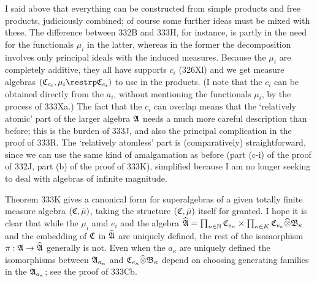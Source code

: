 {I said above that everything can be constructed from simple products and
free products, judiciously combined;  of course some further ideas must
be mixed with these.   The difference between 332B and 333H, for
instance, is partly in the need for the functionals $\mu_i$ in the
latter, whereas in the former the decomposition involves only principal
ideals with the induced measures.   Because the $\mu_i$ are
completely additive, they all have supports $c_i$ (326Xl) and we get
measure
algebras $(\frak C_{c_i},\mu_i\restrp\frak C_{c_i})$ to use in the
products.   (I note that the $c_i$ can be obtained directly from the
$a_i$, without mentioning the functionals $\mu_i$, by the process of
333Xa.)   The fact that the $c_i$ can overlap means that the `relatively
atomic' part of the larger algebra $\frak A$ needs a much more careful
description than before;  this is the burden of 333J, and also the
principal complication in the proof of 333R.   The `relatively atomless'
part is (comparatively) straightforward, since we can use the same kind
of amalgamation as before (part (c-i) of the proof of 332J, part (b)
of the proof of 333K), simplified because I am no longer seeking to deal
with algebras of infinite magnitude.

Theorem 333K gives a canonical form for superalgebras of a given totally
finite measure algebra $(\frak C,\bar\mu)$, taking the structure
$(\frak C,\bar\mu)$ itself for granted.   I hope it is clear that while
the $\mu_i$ amd $e_i$ and the algebra
$\widehat{\frak A}
=\prod_{n\in\Bbb N}\frak C_{e_n}
  \times\prod_{\kappa\in K}
  \frak C_{e_{\kappa}}\widehat{\otimes}\frak B_{\kappa}$ and the embedding of
$\frak C$ in $\widehat{\frak A}$ are uniquely defined, the rest of the
isomorphism $\pi:\frak A\to\widehat{\frak A}$ generally is not.   Even
when the $a_{\kappa}$ are uniquely defined the isomorphisms between
$\frak A_{a_{\kappa}}$ and
$\frak C_{e_{\kappa}}\widehat{\otimes}\frak B_{\kappa}$ depend on
choosing generating families in the $\frak A_{a_{\kappa}}$;
see the proof of 333Cb.

}
